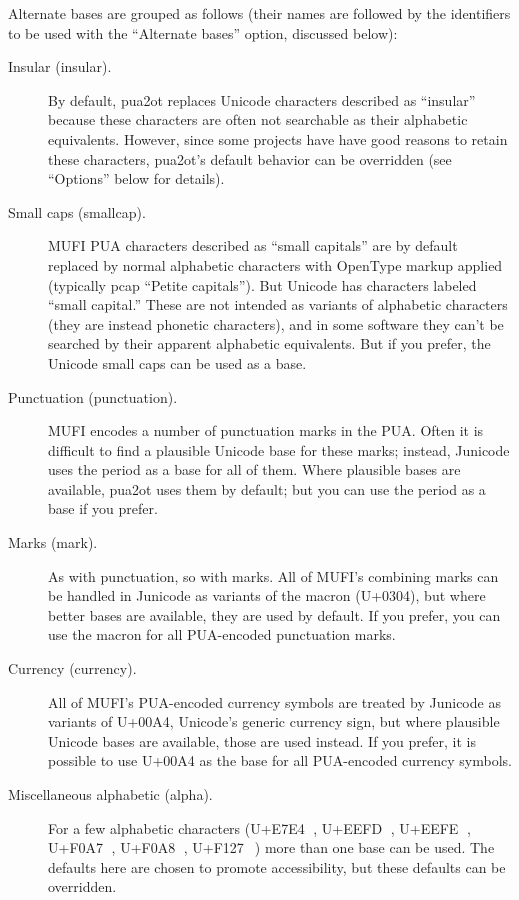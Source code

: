 \documentclass[12pt,letterpaper,openany]{article}
\newcommand\textSourceText[1]{{\color{GGOrange}\textsf{#1}}}
\newcommand{\pto}{\textsf{\color{myLightPurple}pua2ot}}
\begin{document}
Alternate bases are grouped as follows (their names are followed by the 
identifiers to be used with the “Alternate bases” option, discussed below):

\begin{description}
  \item[Insular (\textSourceText{insular}).] By default, {\pto} replaces Unicode 
  characters described as 
  “insular” because these characters are often not searchable as their 
  alphabetic equivalents. However, since some projects have have good reasons 
  to retain these characters, {\pto}'s default behavior can be overridden (see 
  “Options” below for details).

  \item[Small caps (\textSourceText{smallcap}).] MUFI PUA characters described as 
  “small capitals” are 
  by default replaced by normal alphabetic characters with OpenType markup applied 
  (typically \textSourceText{pcap} “Petite capitals”). But Unicode has characters 
  labeled “small capital.” These are not intended as variants of alphabetic
  characters (they are instead phonetic characters), and in some software they 
  can’t be searched by their apparent alphabetic equivalents. But if you 
  prefer, the Unicode small caps can be used as a base.

  \item[Punctuation (\textSourceText{punctuation}).] MUFI encodes a number of 
  punctuation marks in the PUA.
  Often it is difficult to find a plausible Unicode base for these marks;
  instead, Junicode uses the period as a base for all of them. Where
  plausible bases are available, {\pto} uses them by default; but you can
  use the period as a base if you prefer.

  \item[Marks (\textSourceText{mark}).] As with punctuation, so with marks. 
  All of MUFI's combining 
  marks can be handled in Junicode as variants of the macron (U+0304), but 
  where better bases are available, they are used by default. If you prefer,
  you can use the macron for all PUA-encoded punctuation marks.

  \item[Currency (\textSourceText{currency}).] All of MUFI's PUA-encoded currency
  symbols are treated by 
  Junicode as variants of U+00A4, Unicode's generic currency sign, but where 
  plausible Unicode bases are available, those are used instead. If you prefer,
  it is possible to use U+00A4 as the base for all PUA-encoded currency symbols.

  \item[Miscellaneous alphabetic (\textSourceText{alpha}).] For a few alphabetic 
  characters (U+E7E4 , 
  U+EEFD , U+EEFE , U+F0A7 , U+F0A8 , U+F127 \,) more than one base can be 
  used. The defaults here are chosen to promote accessibility, but these 
  defaults can be overridden.
\end{description}
\end{document}
